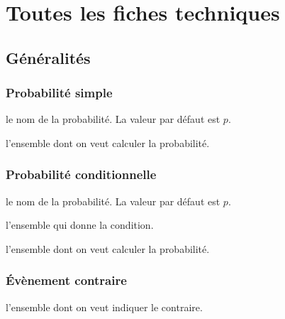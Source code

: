 \documentclass[12pt,a4paper]{article}
\theoremstyle{definition}
\newcommand\extraspace{
	\vspace{0.25em}
}
\begin{document}
\newpage
\section{Toutes les fiches techniques} \label{techincal-ids}












\subsection{Généralités}

\subsubsection{Probabilité \og simple \fg}




\IDoption{} le nom de la probabilité. La valeur par défaut est $p$.

\IDarg{} l'ensemble dont on veut calculer la probabilité.




\subsubsection{Probabilité conditionnelle}





\extraspace




\IDoption{} le nom de la probabilité. La valeur par défaut est $p$.

 l'ensemble qui donne la condition.

 l'ensemble dont on veut calculer la probabilité.


\subsubsection{Évènement contraire}




\IDarg{} l'ensemble dont on veut indiquer le contraire.
\end{document}
